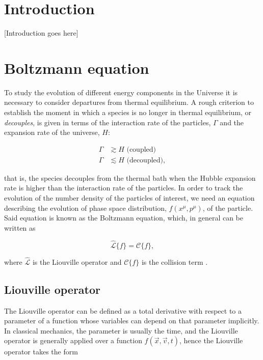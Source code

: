 \documentclass[final,5p,times,twocolumn, nopreprintline]{elsarticle}
\numberwithin{equation}{section}
\begin{document}



\section{Introduction}

[Introduction goes here]

\section{Boltzmann equation}

To study the evolution of different energy components in the Universe it is necessary to consider departures from thermal equilibrium. A rough criterion to establish the moment in which a species is no longer in thermal equilibrium, or \emph{decouples}, is given in terms of the interaction rate of the particles, $\Gamma$ and the expansion rate of the universe, $H$:

\begin{align}
\Gamma&\gtrsim H \text{ (coupled)}\nonumber\\
\Gamma&\lesssim H \text{ (decoupled)}, \label{eq:decoupling}
\end{align}

that is, the species decouples from the thermal bath when the Hubble expansion rate is higher than the interaction rate of the particles. In order to track the evolution of the number density of the particles of interest, we need an equation describing the evolution of phase space distribution, $f(x^\mu,p^\mu)$, of the particle. Said equation is known as the Boltzmann equation, which, in general can be written as

\begin{equation}
\hat{\mathcal{L}}\{f\}=\mathcal{C}\{f\},\label{eq:Boltz_gen}
\end{equation}

where $\hat{\mathcal{L}}$ is the Liouville operator and $\mathcal{C}\{f\}$ is the collision term \cite{kolb1991early}.

\subsection{Liouville operator}

The Liouville operator can be defined as a total derivative with respect to a parameter of a function whose variables can depend on that parameter implicitly. In classical mechanics, the parameter is usually the time, and the Liouville operator is generally applied over a function $f(\vec{x},\vec{v},t)$, hence the Liouville operator takes the form
\end{document}
